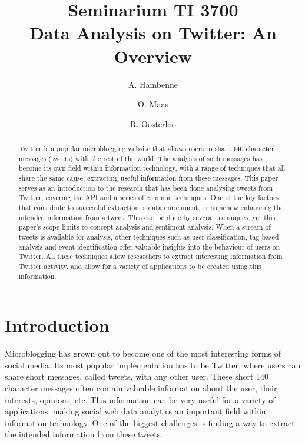 \documentclass{article}
\title{Seminarium TI 3700\\ Data Analysis on Twitter: An Overview}
\author{A. Hambenne  \and
    O. Maas \and
    R. Oosterloo}
\date{}
\begin{document}
\maketitle
\thispagestyle{empty}

\begin{abstract}


Twitter is a popular microblogging website that allows users to share 140 character messages (tweets) with the rest of the world.
The analysis of such messages has become its own field within information technology, with a range of techniques that all share the same cause:
extracting useful information from these messages. This paper serves as an introduction to the research that has been done analysing tweets from Twitter,
covering the API and a series of common techniques. One of the key factors that contribute to successful extraction is data enrichment, or somehow enhancing
the intended information from a tweet. This can be done by several techniques, yet this paper's scope limits to concept analysis and sentiment analysis.
When a stream of tweets is available for analysis, other techniques such as user classification, tag-based analysis and event identification offer valuable
insights into the behaviour of users on Twitter. All these techniques allow researchers to extract interesting information from Twitter activity, and allow
for a variety of applications to be created using this information.
\end{abstract}


\section{Introduction}





Microblogging has grown out to become one of the most interesting forms of social media. Its most popular implementation has to be Twitter, 
where users can share short messages, called tweets, with any other user. These short 140 character messages often contain valuable information about the user, their
interests, opinions, etc. This information can be very useful for a variety of applications, making social web data analytics an important field within
information technology. One of the biggest challenges is finding a way to extract the intended information from these tweets. 
\end{document}
